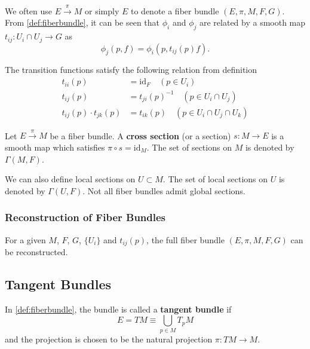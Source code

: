 \documentclass[10pt]{article}
\begin{document}
We often use $E\xrightarrow{\pi}M$ or simply $E$ to denote a fiber bundle $(E,\pi,M,F,G)$.
From \cref{def:fiberbundle}, it can be seen that $\phi_i$ and $\phi_j$ are related by a smooth map $t_{ij}:U_i\cap U_j\to G$ as 
\begin{equation}\label{eq:fiberbundle_transition}
    \phi_j(p,f)=\phi_i(p,t_{ij}(p)f).
\end{equation}
\begin{property}
    The transition functions satisfy the following relation from definition
    \begin{subequations}
        \begin{align}
            t_{ii}(p)&=\text{id}_F\quad(p\in U_i)\\
            t_{ij}(p)&=t_{ji}(p)^{-1}\quad(p\in U_i\cap U_j)\\
            t_{ij}(p)\cdot t_{jk}(p)&=t_{ik}(p)\quad(p\in U_i\cap U_j\cap U_k)
        \end{align}
    \end{subequations}
\end{property}


\begin{definition}
    Let $E\xrightarrow{\pi}M$ be a fiber bundle.
    A \textbf{cross section} (or a section) $s:M\to E$ is a smooth map which satisfies $\pi\circ s=\text{id}_M$.
    The set of sections on $M$ is denoted by $\Gamma(M,F)$.
\end{definition}
\begin{remark}
    We can also define local sections on $U\subset M$.
    The set of local sections on $U$ is denoted by $\Gamma(U,F)$.
    Not all fiber bundles admit global sections.
\end{remark}

\subsubsection{Reconstruction of Fiber Bundles}

\begin{proposition}
    For a given $M$, $F$, $G$, $\{U_i\}$ and $t_{ij}(p)$, the full fiber bundle $(E,\pi,M,F,G)$ can be reconstructed.
\end{proposition}

\subsection{Tangent Bundles}
\begin{definition}
    In \cref{def:fiberbundle}, the bundle is called a \textbf{tangent bundle} if 
    \begin{equation}
        E=TM\equiv\bigcup_{p\in M}T_p M
    \end{equation}
     and the projection is chosen to be the natural projection $\pi:TM\to M$.
\end{definition}
\end{document}
